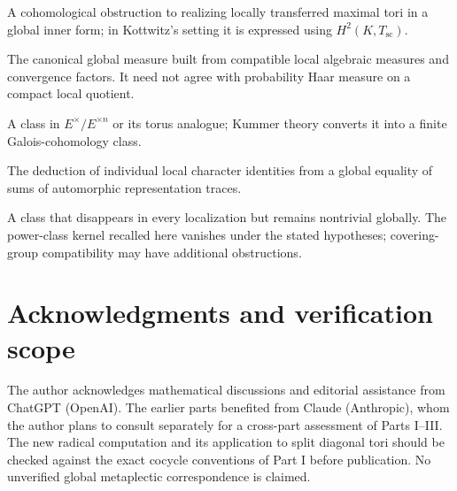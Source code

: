 \documentclass[11pt]{article}
\theoremstyle{plain}
\theoremstyle{definition}
\begin{document}
\begin{description}[style=nextline,leftmargin=2.5cm]
A cohomological obstruction to realizing locally transferred maximal
tori in a global inner form; in Kottwitz's setting it is expressed
using $H^2(K,T_{\mathrm{sc}})$.
\item[Tamagawa measure]
The canonical global measure built from compatible local algebraic
measures and convergence factors.  It need not agree with probability
Haar measure on a compact local quotient.
\item[Kummer class]
A class in $E^\times/E^{\times n}$ or its torus analogue;
Kummer theory converts it into a finite Galois-cohomology class.
\item[Spectral separation]
The deduction of individual local character identities from a
global equality of sums of automorphic representation traces.
\item[Local-to-global obstruction]
A class that disappears in every localization but remains nontrivial
globally.  The power-class kernel recalled here vanishes under the
stated hypotheses; covering-group compatibility may have additional
obstructions.
\end{description}

\section*{Acknowledgments and verification scope}
The author acknowledges mathematical discussions and editorial
assistance from ChatGPT (OpenAI).  The earlier parts benefited from
Claude (Anthropic), whom the author plans to consult separately for a cross-part
assessment of Parts I--III.  The new radical computation and its
application to split diagonal tori should be checked against the
exact cocycle conventions of Part I before publication.  No
unverified global metaplectic correspondence is claimed.
\end{document}
